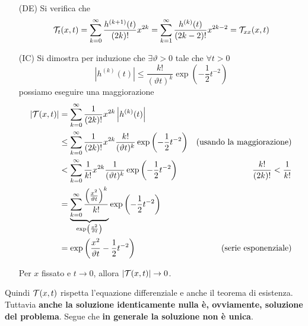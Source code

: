 \begin{dimostrazione}
    \ \\
    \begin{enumerate}
        \item[(DE)] Si verifica che
              \begin{equation*}
                  \mathcal{T} _{t}(x,t) =\sum\limits _{k=0}^{\infty }\frac{h^{(k+1)}(t)}{(2k) !} x^{2k} =\sum\limits _{k=1}^{\infty }\frac{h^{(k)}(t)}{(2k-2) !} x^{2k-2} =\mathcal{T} _{xx}(x,t)
              \end{equation*}
        \item[(IC)] Si dimostra per induzione che $\exists \vartheta  >0$ tale che $\forall t >0$
              \begin{equation*}
                  \left| h^{(k)}(t)\right| \leq \frac{k!}{(\vartheta t)^{k}}\exp\left(-\frac{1}{2} t^{-2}\right)
              \end{equation*}possiamo eseguire una maggiorazione
              \begin{align*}
                  | \mathcal{T} (x,t)| & =\sum\limits _{k=0}^{\infty }\frac{1}{(2k) !} x^{2k}\left| h^{(k)}(t)\right|                                                                                                     &                                  \\
                                & \leq \sum\limits _{k=0}^{\infty }\frac{1}{(2k) !} x^{2k}\frac{k!}{(\vartheta t)^{k}}\exp\left(-\frac{1}{2} t^{-2}\right)                                                    & \text{(usando la maggiorazione)} \\
                                & < \sum\limits _{k=0}^{\infty }\frac{1}{k!} x^{2k}\frac{1}{(\vartheta t)^{k}}\exp\left(-\frac{1}{2} t^{-2}\right)                                                                 & \frac{k!}{(2k) !} < \frac{1}{k!} \\
                                & =\underbrace{\sum\limits _{k=0}^{\infty }\frac{\left(\frac{x^{2}}{\vartheta t}\right)^{k}}{k!}}_{\exp\left(\frac{x^{2}}{\vartheta t}\right)}\exp\left(-\frac{1}{2} t^{-2}\right) &                                  \\
                                & =\exp\left(\frac{x^{2}}{\vartheta t} -\frac{1}{2} t^{-2}\right)                                                                                                                  & \text{(serie esponenziale)}
              \end{align*}

              Per $x$ fissato e $t\rightarrow 0$, allora $| \mathcal{T} (x,t)| \rightarrow 0$.
    \end{enumerate}
\end{dimostrazione}
Quindi $\mathcal{T} (x,t)$ rispetta l'equazione differenziale e anche il teorema di esistenza. Tuttavia \textbf{anche la soluzione identicamente nulla è, ovviamente, soluzione del problema}. Segue che \textbf{in generale la soluzione non è unica}.

